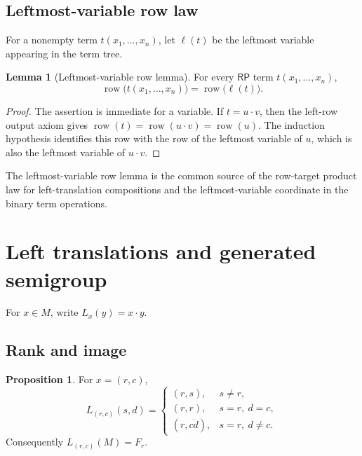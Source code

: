 \documentclass[11pt]{article}
\theoremstyle{definition}
\newtheorem{lemma}[theorem]{Lemma}
\newtheorem{proposition}[theorem]{Proposition}
\newcommand{\RP}{\mathsf{RP}}
\begin{document}
\subsection{Leftmost-variable row law}\label{leftmost-variable-row-law}\label{leftmost-variable-row-principle}

For a nonempty term \(t(x_1,\ldots,x_n)\), let \(\ell(t)\) be the
leftmost variable appearing in the term tree.

\begin{lemma}[Leftmost-variable row lemma]
\label{lem:13.1}
For every \(\RP\) term \(t(x_1,\ldots,x_n)\),
\[
\operatorname{row}\bigl(t(x_1,\ldots,x_n)\bigr)
=
\operatorname{row}\bigl(\ell(t)\bigr).
\]
\end{lemma}

\begin{proof}
The assertion is immediate for a variable.  If \(t=u\cdot v\), then the
left-row output axiom gives
\(\operatorname{row}(t)=\operatorname{row}(u\cdot v)=\operatorname{row}(u)\).
The induction hypothesis identifies this row with the row of the leftmost
variable of \(u\), which is also the leftmost variable of \(u\cdot v\).
\end{proof}

The leftmost-variable row lemma is the common source of the row-target product law for
left-translation compositions and the leftmost-variable coordinate in the binary term operations.

\section{Left translations and generated semigroup}\label{left-translations-generated-semigroup}\label{left-regular-operators}

For \(x\in M\), write \(L_x(y)=x\cdot y\).

\subsection{Rank and image}\label{rank-and-image}\label{row-fiber-normal-form}

\begin{proposition}
\label{prop:14.1}
For \(x=(r,c)\),
\[
L_{(r,c)}(s,d)=
\begin{cases}
(r,s), & s\ne r,\\[1mm]
(r,r), & s=r,\ d=c,\\[1mm]
(r,\overline{cd}), & s=r,\ d\ne c.
\end{cases}
\]
Consequently \(L_{(r,c)}(M)=F_r\).
\end{proposition}
\end{document}
